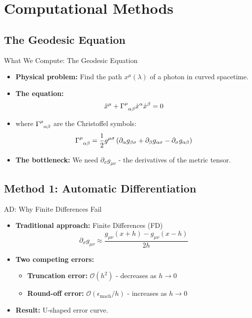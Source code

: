 \documentclass[10pt, aspectratio=169]{beamer}
\begin{document}
	\section{Computational Methods}
	
	\subsection{The Geodesic Equation}
	
	\begin{frame}{What We Compute: The Geodesic Equation}
		\begin{itemize}
			\item \textbf{Physical problem:} Find the path $x^\mu(\lambda)$ of a photon in curved spacetime.
			\item \textbf{The equation:}
			\begin{equation}
				\ddot{x}^\mu + \tensor{\Gamma}{^\mu_{\alpha\beta}} \dot{x}^\alpha \dot{x}^\beta = 0
			\end{equation}
			\item where $\tensor{\Gamma}{^\mu_{\alpha\beta}}$ are the Christoffel symbols:
			\begin{equation}
				\tensor{\Gamma}{^\mu_{\alpha\beta}} = \frac{1}{2} g^{\mu\sigma} \left( \partial_\alpha g_{\beta\sigma} + \partial_\beta g_{\alpha\sigma} - \partial_\sigma g_{\alpha\beta} \right)
			\end{equation}
			\item \textbf{The bottleneck:} We need $\partial_\sigma g_{\mu\nu}$ - the derivatives of the metric tensor.
		\end{itemize}
	\end{frame}
	
	\subsection{Method 1: Automatic Differentiation}
	
	\begin{frame}{AD: Why Finite Differences Fail}
		\begin{itemize}
			\item \textbf{Traditional approach:} Finite Differences (FD)
			\begin{equation}
				\partial_\sigma g_{\mu\nu} \approx \frac{g_{\mu\nu}(x+h) - g_{\mu\nu}(x-h)}{2h}
			\end{equation}
			\item \textbf{Two competing errors:}
			\begin{itemize}
				\item \textbf{Truncation error:} $\mathcal{O}(h^2)$ - decreases as $h \to 0$
				\item \textbf{Round-off error:} $\mathcal{O}(\epsilon_{\text{mach}}/h)$ - increases as $h \to 0$
			\end{itemize}
			\item \textbf{Result:} U-shaped error curve.
		\end{itemize}
	\end{frame}
	
\end{document}
